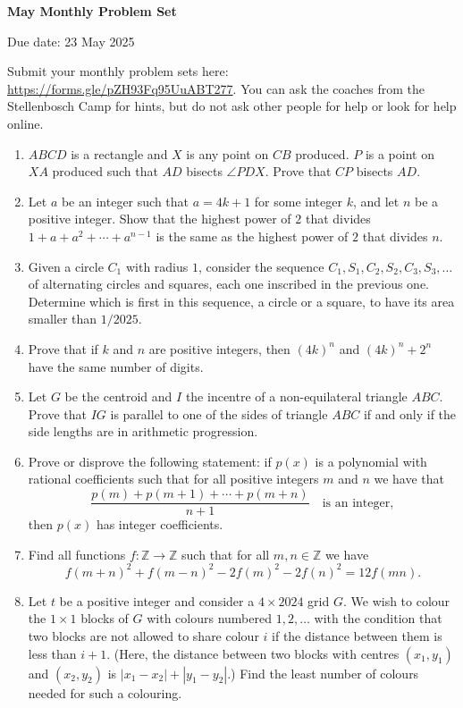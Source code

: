 \documentclass[12pt]{article}
\begin{document}
\begin{center} \bfseries \large
    May Monthly Problem Set

    Due date: 23 May 2025
\end{center}

\bigskip
Submit your monthly problem sets here: \url{https://forms.gle/pZH93Fq95UuABT277}.
You can ask the coaches from the Stellenbosch Camp for hints, but do not ask other people for help or look for help online.

\begin{enumerate}[topsep=\bigskipamount,itemsep=\bigskipamount,leftmargin=0pt]
\item $ABCD$ is a rectangle and $X$ is any point on $CB$ produced.
$P$ is a point on $XA$ produced such that $AD$ bisects $\angle PDX$.
Prove that $CP$ bisects $AD$.

\item Let $a$ be an integer such that $a = 4k+1$ for some integer $k$, and let $n$ be a positive integer.
Show that the highest power of $2$ that divides $1 +a +a^2 +\dotsb + a^{n-1}$ is the same as the highest power of $2$ that divides $n$.

\item Given a circle $C_1$ with radius $1$, consider the sequence $C_1, S_1, C_2, S_2, C_3, S_3, \dotsc$ of alternating circles and squares, each one inscribed in the previous one.
Determine which is first in this sequence, a circle or a square, to have its area smaller than $1/2025$.

\item Prove that if $k$ and $n$ are positive integers, then $(4k)^n$ and $(4k)^n+2^n$ have the same number of digits.

\item 
Let $G$ be the centroid and $I$ the incentre of a non-equilateral triangle $ABC$.
Prove that $IG$ is parallel to one of the sides of triangle $ABC$ if and only if the side lengths are in arithmetic progression.

\item Prove or disprove the following statement: if $p(x)$ is a polynomial with rational coefficients such that for all positive integers $m$ and $n$ we have that
\[ \frac{p(m) +p(m+1) +\dotsb +p(m+n)}{n+1} \quad\text{is an integer}, \]
then $p(x)$ has integer coefficients.

\item Find all functions $f : \mathbb{Z} \to \mathbb{Z}$ such that for all $m,n \in \mathbb{Z}$ we have
\[ f(m+n)^2 +f(m-n)^2 -2f(m)^2-2f(n)^2 = 12f(mn). \]

\item 
Let $t$ be a positive integer and consider a $4\times 2024$ grid $G$.
We wish to colour the $1\times 1$ blocks of $G$ with colours numbered $1,2,\dotsc$ with the condition that two blocks are not allowed to share colour $i$ if the distance between them is less than $i+1$.
(Here, the distance between two blocks with centres $(x_1,y_1)$ and $(x_2,y_2)$ is $|x_1-x_2|+|y_1-y_2|$.)
Find the least number of colours needed for such a colouring.
\end{enumerate}
\end{document}
